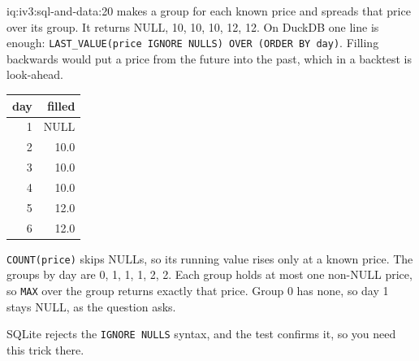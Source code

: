 \begin{solution}{iq:iv3:sql-and-data:20}
 makes a group for each known price and spreads that price over its group. It returns NULL, 10, 10, 10, 12, 12. On DuckDB one line is enough: \texttt{LAST\_VALUE(price IGNORE NULLS) OVER (ORDER BY day)}. Filling backwards would put a price from the future into the past, which in a backtest is look-ahead.
\label{lst:iv3:sq:ffill}
\begin{center}\small
\begin{tabular}{rr}
day & filled\\\hline
1 & NULL\\
2 & 10.0\\
3 & 10.0\\
4 & 10.0\\
5 & 12.0\\
6 & 12.0
\end{tabular}
\end{center}
\texttt{COUNT(price)} skips NULLs, so its running value rises only at a known price. The groups by day are 0, 1, 1, 1, 2, 2. Each group holds at most one non-NULL price, so \texttt{MAX} over the group returns exactly that price. Group 0 has none, so day 1 stays NULL, as the question asks.

SQLite rejects the \texttt{IGNORE NULLS} syntax, and the test confirms it, so you need this trick there.

\end{solution}

